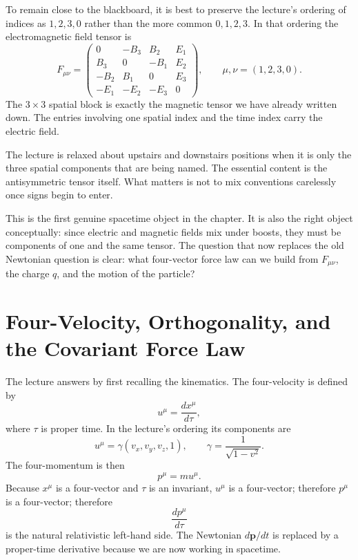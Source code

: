 To remain close to the blackboard, it is best to preserve the lecture's ordering of indices as \(1,2,3,0\) rather than the more common \(0,1,2,3\). In that ordering the electromagnetic field tensor is
\begin{equation}
F_{\mu\nu}
=
\begin{pmatrix}
0 & -B_3 & B_2 & E_1 \\
B_3 & 0 & -B_1 & E_2 \\
-B_2 & B_1 & 0 & E_3 \\
-E_1 & -E_2 & -E_3 & 0
\end{pmatrix},
\qquad
\mu,\nu=(1,2,3,0).
\end{equation}
The \(3\times 3\) spatial block is exactly the magnetic tensor we have already written down. The entries involving one spatial index and the time index carry the electric field.

\begin{remark}
The lecture is relaxed about upstairs and downstairs positions when it is only the three spatial components that are being named. The essential content is the antisymmetric tensor itself. What matters is not to mix conventions carelessly once signs begin to enter.
\end{remark}

This is the first genuine spacetime object in the chapter. It is also the right object conceptually: since electric and magnetic fields mix under boosts, they must be components of one and the same tensor. The question that now replaces the old Newtonian question is clear: what four-vector force law can we build from \(F_{\mu\nu}\), the charge \(q\), and the motion of the particle?

\section{Four-Velocity, Orthogonality, and the Covariant Force Law}

The lecture answers by first recalling the kinematics. The four-velocity is defined by
\begin{equation}
u^\mu=\frac{dx^\mu}{d\tau},
\end{equation}
where \(\tau\) is proper time. In the lecture's ordering its components are
\begin{equation}
u^\mu=\gamma(v_x,v_y,v_z,1),
\qquad
\gamma=\frac{1}{\sqrt{1-v^2}}.
\end{equation}
The four-momentum is then
\begin{equation}
p^\mu = m u^\mu.
\end{equation}
Because \(x^\mu\) is a four-vector and \(\tau\) is an invariant, \(u^\mu\) is a four-vector; therefore \(p^\mu\) is a four-vector; therefore
\begin{equation}
\frac{dp^\mu}{d\tau}
\end{equation}
is the natural relativistic left-hand side. The Newtonian \(d\mathbf p/dt\) is replaced by a proper-time derivative because we are now working in spacetime.

